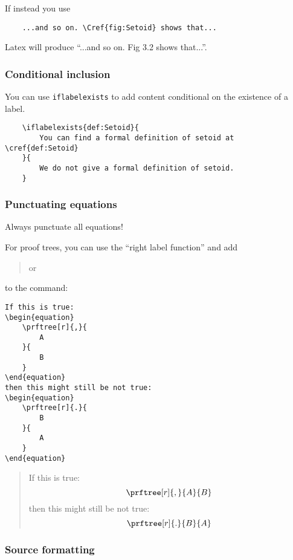 If instead you use 
\begin{verbatim}
    ...and so on. \Cref{fig:Setoid} shows that...
\end{verbatim}
Latex will produce ``...and so on. Fig 3.2 shows that...''.

\subsubsection*{Conditional inclusion}

You can use \texttt{iflabelexists} to add content conditional on the existence of a label.

\begin{verbatim}
    \iflabelexists{def:Setoid}{
        You can find a formal definition of setoid at \cref{def:Setoid}
    }{
        We do not give a formal definition of setoid.
    }
\end{verbatim}

\subsubsection*{Punctuating equations}

Always punctuate all equations!

For proof trees, you can use the ``right label function'' and add 
\begin{quote}\centering
\str{[r]{,}} \qquad or \qquad \str{[r]{,}}  
\end{quote}
to the  command:
\begin{verbatim}
If this is true:
\begin{equation}
    \prftree[r]{,}{
        A
    }{ 
        B
    }
\end{equation}
then this might still be not true:
\begin{equation}
    \prftree[r]{.}{
        B
    }{ 
        A
    }
\end{equation}
\end{verbatim}
\begin{quote}
    If this is true:
\begin{equation}
    \prftree[r]{,}{
        A
    }{ 
        B
    }
\end{equation}
then this might still be not true:
\begin{equation}
    \prftree[r]{.}{
        B
    }{ 
        A
    }
\end{equation}
\end{quote}
\subsubsection*{Source formatting}

